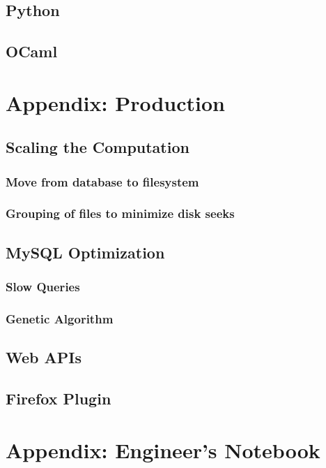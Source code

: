     \section{Python}
    \section{OCaml}
\chapter{Appendix: Production}
    \section{Scaling the Computation}
        \subsection{Move from database to filesystem}
        \subsection{Grouping of files to minimize disk seeks}
    \section{MySQL Optimization}
        \subsection{Slow Queries}
        \subsection{Genetic Algorithm}
    \section{Web APIs}
    \section{Firefox Plugin}
\chapter{Appendix: Engineer's Notebook}

